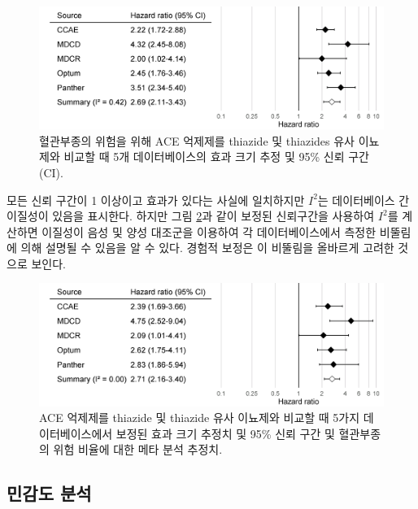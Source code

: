 \documentclass[10.5pt]{book}
\theoremstyle{definition}
\theoremstyle{definition}
\theoremstyle{definition}
\theoremstyle{remark}
\begin{document}
\begin{figure}

{\centering \includegraphics[width=0.9\linewidth]{images/MethodValidity/forest} 

}

\caption{혈관부종의 위험을 위해 ACE 억제제를 thiazide 및 thiazides 유사 이뇨제와 비교할 때 5개 데이터베이스의 효과 크기 추정 및 95\% 신뢰 구간(CI).}\label{fig:forest}
\end{figure}

모든 신뢰 구간이 1 이상이고 효과가 있다는 사실에 일치하지만 \(I^2\)는
데이터베이스 간 이질성이 있음을 표시한다. 하지만 그림
\ref{fig:forestCal}과 같이 보정된 신뢰구간을 사용하여 \(I^2\)를 계산하면
이질성이 음성 및 양성 대조군을 이용하여 각 데이터베이스에서 측정한
비뚤림에 의해 설명될 수 있음을 알 수 있다. 경험적 보정은 이 비뚤림을
올바르게 고려한 것으로 보인다.

\begin{figure}

{\centering \includegraphics[width=0.9\linewidth]{images/MethodValidity/forestCal} 

}

\caption{ACE 억제제를 thiazide 및 thiazide 유사 이뇨제와 비교할 때 5가지 데이터베이스에서 보정된 효과 크기 추정치 및 95\% 신뢰 구간 및 혈관부종의 위험 비율에 대한 메타 분석 추정치.}\label{fig:forestCal}
\end{figure}

\subsection{민감도 분석}\label{--1}
\end{document}
